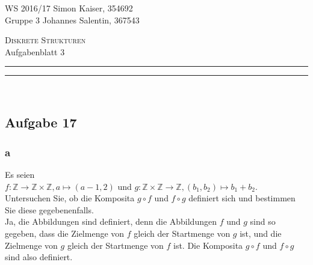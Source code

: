 \documentclass[a4paper,graphics,11pt]{article}
\newcommand\aufgabe[1]{\subsection*{Aufgabe #1}}
\newcommand\aufgabenteil[1]{\subsubsection*{#1}}
\begin{document}
\noindent WS 2016/17        							\hfill Simon Kaiser, 354692 \\
\noindent Gruppe 3                                      \hfill Johannes Salentin, 367543 \\

\begin{center}
\Large \textsc{Diskrete Strukturen} \\   %
\large Aufgabenblatt 3                        %
\end{center}
\begin{center}
\rule[0.5ex]{\textwidth}{0.6pt}\vspace*{-\baselineskip}\vspace{3.2pt}
\rule[0.5ex]{\textwidth}{1.6pt}\\
\end{center}
\aufgabe{17}
\aufgabenteil{a}
Es seien \\
$f: \mathbb{Z} \to \mathbb{Z} \times \mathbb{Z}, a \mapsto (a-1,2)$ und $g: \mathbb{Z} \times \mathbb{Z} \to \mathbb{Z}, (b_{1}, b_{2}) \mapsto b_{1} + b_{2}$. \\
Untersuchen Sie, ob die Komposita $g \circ f$ und $f \circ g$ definiert sich und bestimmen Sie diese gegebenenfalls.\\
Ja, die Abbildungen sind definiert, denn die Abbildungen $f$ und $g$ sind so gegeben, dass die Zielmenge von $f$ gleich der Startmenge von $g$ ist, und die Zielmenge von $g$ gleich der Startmenge von $f$ ist. Die Komposita $g \circ f$ und $f \circ g$ sind also definiert. \\
\end{document}
